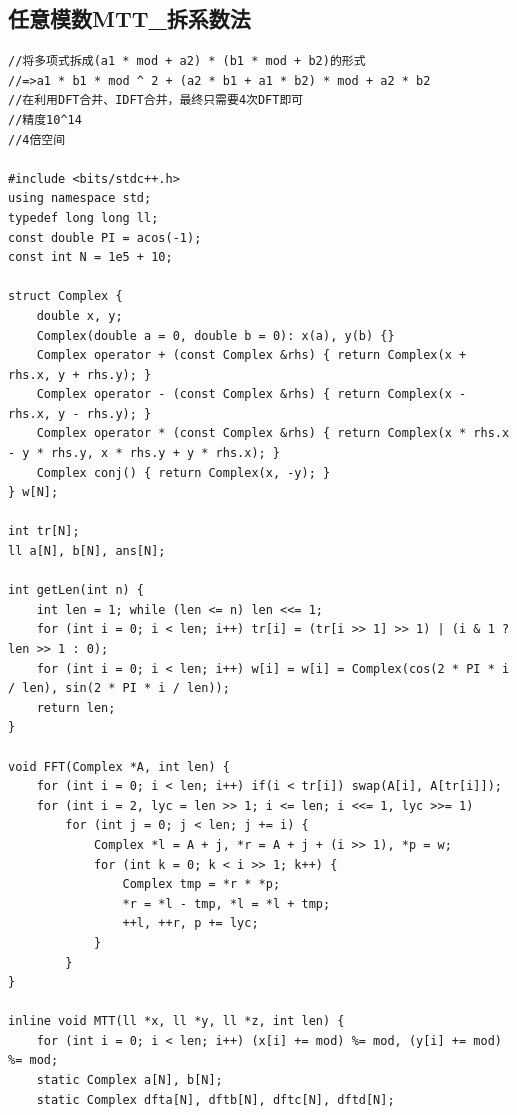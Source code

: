 \documentclass[twoside]{article}
\begin{document}
\subsection{任意模数MTT_拆系数法}
\begin{lstlisting}
//将多项式拆成(a1 * mod + a2) * (b1 * mod + b2)的形式
//=>a1 * b1 * mod ^ 2 + (a2 * b1 + a1 * b2) * mod + a2 * b2
//在利用DFT合并、IDFT合并，最终只需要4次DFT即可
//精度10^14
//4倍空间

#include <bits/stdc++.h>
using namespace std;
typedef long long ll;
const double PI = acos(-1);
const int N = 1e5 + 10;

struct Complex {
    double x, y;
    Complex(double a = 0, double b = 0): x(a), y(b) {}
    Complex operator + (const Complex &rhs) { return Complex(x + rhs.x, y + rhs.y); }
    Complex operator - (const Complex &rhs) { return Complex(x - rhs.x, y - rhs.y); }
    Complex operator * (const Complex &rhs) { return Complex(x * rhs.x - y * rhs.y, x * rhs.y + y * rhs.x); }
    Complex conj() { return Complex(x, -y); }
} w[N];

int tr[N];
ll a[N], b[N], ans[N];

int getLen(int n) {
    int len = 1; while (len <= n) len <<= 1;
    for (int i = 0; i < len; i++) tr[i] = (tr[i >> 1] >> 1) | (i & 1 ? len >> 1 : 0);
    for (int i = 0; i < len; i++) w[i] = w[i] = Complex(cos(2 * PI * i / len), sin(2 * PI * i / len));
    return len;
}

void FFT(Complex *A, int len) {
    for (int i = 0; i < len; i++) if(i < tr[i]) swap(A[i], A[tr[i]]);
    for (int i = 2, lyc = len >> 1; i <= len; i <<= 1, lyc >>= 1)
        for (int j = 0; j < len; j += i) {
            Complex *l = A + j, *r = A + j + (i >> 1), *p = w;
            for (int k = 0; k < i >> 1; k++) {
                Complex tmp = *r * *p;
                *r = *l - tmp, *l = *l + tmp;
                ++l, ++r, p += lyc;
            }
        }
}

inline void MTT(ll *x, ll *y, ll *z, int len) {
    for (int i = 0; i < len; i++) (x[i] += mod) %= mod, (y[i] += mod) %= mod;
    static Complex a[N], b[N];
    static Complex dfta[N], dftb[N], dftc[N], dftd[N];


\end{lstlisting}
\end{document}
